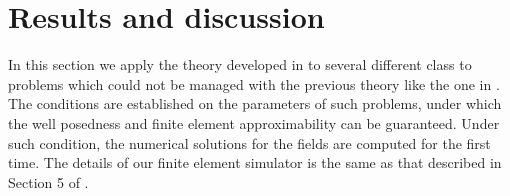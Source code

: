 \section{Results and discussion}  
In this section we apply the theory developed in \cite{kalarickel2020well} to 
several different class to problems which could not be managed with the 
previous theory like the one in \cite{bianisotropi_m3as}.
The conditions are established on the parameters of such problems, 
under which the well posedness and finite element 
approximability  can be guaranteed.
Under such condition, the numerical solutions for the fields are 
computed for the first time.
The details of our finite element simulator is the same as that 
described in Section 5 of \cite{kalarickel2020well}.




